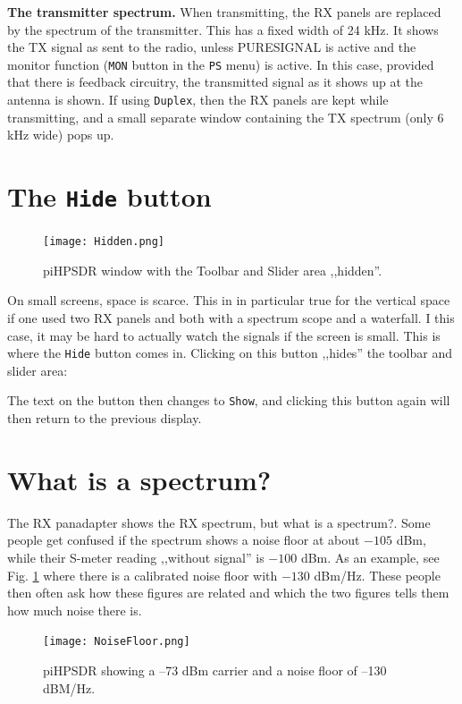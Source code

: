 \documentclass[12pt]{book}
\def\rett#1{\texttt{\color{red}#1}}
\def\bltt#1{\texttt{\color{blue}#1}}
\def\pH{pi\-HPSDR\xspace}
\begin{document}
\textbf{The transmitter spectrum.} When transmitting, the RX panels are replaced
by the spectrum of the transmitter. This has a fixed width of 24 kHz. It shows
the TX signal as sent to the radio, unless PURESIGNAL is active and the monitor
function (\rett{MON} button in the \bltt{PS} menu) is active. In this case,
provided that there is feedback circuitry, the transmitted signal as it shows up
at the antenna is shown. If using \bltt{Duplex}, then the RX panels are kept while
transmitting, and a small separate window containing the TX spectrum (only 6 kHz wide)
pops up.
\section{The \texttt{Hide} button}
\begin{figure}[ht]
\center
\texttt{[image: Hidden.png]}
\caption{\pH window with the Toolbar and Slider
area ,,hidden''.}
\end{figure}

On small screens, space is scarce. This in in particular true
for the vertical space if one used two RX panels and both
with a spectrum scope and a waterfall. I this case, it may be
hard to actually watch the signals if the screen is small.
This is where the \rett{Hide} button comes in. Clicking on
this button ,,hides'' the toolbar and slider area:


The text on the button then changes to \rett{Show}, and
clicking this button again will then return to the
previous display.

\section{What is a spectrum?}
The RX panadapter shows the RX spectrum, but what is a spectrum?.
Some people get confused if the spectrum shows a noise floor at about $-105$ dBm, while their S-meter
reading ,,without signal'' is $-100$ dBm. As an example, see Fig. \ref{fig:noisefloor}
where there is a calibrated noise floor with $-130$ dBm/Hz.
These people then often ask how these figures are related and which  the two figures tells
them how much noise there is.

\begin{figure}[ht]
\center
\texttt{[image: NoiseFloor.png]}
\caption{\pH showing a --73 dBm carrier and a noise floor
of --130 dBM/Hz.}
\label{fig:noisefloor}
\end{figure}
\end{document}
